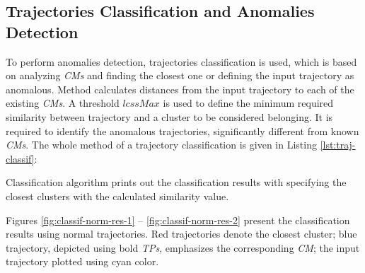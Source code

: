 \subsection{Trajectories Classification and Anomalies Detection}

To perform anomalies detection, trajectories classification is used, which is based on analyzing \textit{CMs} and finding the closest one or defining the input trajectory as anomalous. Method calculates distances from the input trajectory to each of the existing \textit{CMs}. A threshold $lcssMax$ is used to define the minimum required similarity between trajectory and a cluster to be considered belonging. It is required to identify the anomalous trajectories, significantly different from known \textit{CMs}. The whole method of a trajectory classification is given in Listing \ref{lst:traj-classif}:



Classification algorithm prints out the classification results with specifying the closest clusters with the calculated similarity value.

Figures \ref{fig:classif-norm-res-1} -- \ref{fig:classif-norm-res-2} present the classification results using normal trajectories. Red trajectories denote the closest cluster; blue trajectory, depicted using bold \textit{TPs}, emphasizes the corresponding \textit{CM}; the input trajectory plotted using cyan color.

